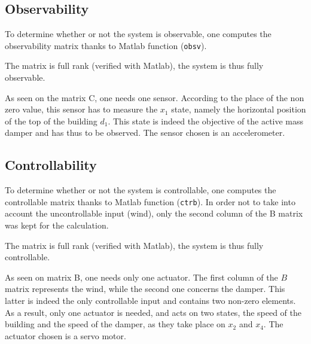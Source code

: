 \subsection{Observability}
To determine whether or not the system is observable, one computes the observability matrix thanks to Matlab function (\texttt{obsv}).\par
The matrix is full rank (verified with Matlab), the system is thus fully observable.\par
As seen on the matrix C, one needs one sensor. According to the place of the non zero value, this sensor has to measure the $x_1$ state, namely the horizontal position of the top of the building $d_1$. This state is indeed the objective of the active mass damper and has thus to be observed. The sensor chosen is an accelerometer.

\subsection{Controllability}
To determine whether or not the system is controllable, one computes the controllable matrix thanks to Matlab function (\texttt{ctrb}). In order not to take into account the uncontrollable input (wind), only the second column of the B matrix was kept for the calculation.\par
The matrix is full rank (verified with Matlab), the system is thus fully controllable.\par
As seen on matrix B, one needs only one actuator. The first column of the $B$ matrix represents the wind, while the second one concerns the damper. This latter is indeed the only controllable input and contains two non-zero elements. As a result, only one actuator is needed, and acts on two states, the speed of the building and the speed of the damper, as they take place on $x_2$ and $x_4$. The actuator chosen is a servo motor.
